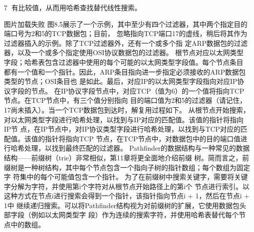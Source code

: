                                                             7
有比较值，从而用哈希查找替代线性搜索。




 图片加载失败
图8.5展示了一个示例，其中至少有四个过滤器，其中两个指定目的端口号为2和5的TCP数据包；目前，
忽略指向TCP端口17的虚线，稍后将其作为过滤器插入的示例。除了TCP过滤器外，还有一个或多个指
定ARP数据包的过滤器，以及一个或多个指定使用OSI协议数据包的过滤器。
根节点对应以太网类型字段；哈希表包含过滤器中使用的每个可能的以太网类型字段值。每个节点条目
都有一个值和一个指针。因此，ARP条目指向进一步指定必须接收的ARP数据包类型的节点；OSI条目也
是如此。最后，对应IP的以太网类型字段指向对应IP协议字段的节点。
在IP协议字段节点中，对应TCP（值为6）的一个值将指向TCP节点。在TCP节点中，有三个值分别指向
目的端口值为2和5的过滤器（请记住，17尚未插入）。当一个TCP数据包到达时，解复用过程如下。
从根节点开始搜索，对以太网类型字段进行哈希处理，以找到与IP对应的匹配值。该值的指针将指向IP节
点，在IP节点中，对IP协议类型字段进行哈希处理，以找到与TCP对应的匹配值。该值的指针将指向TCP
节点，在TCP节点中，对数据包中的目的端口值进行哈希处理，以找到最终匹配的过滤器。
Pathfinder的数据结构与一种常见的数据结构——前缀树（trie）非常相似，第11章将更全面地介绍前缀
树。简而言之，前缀树是一种树结构，其中每个节点包含一个指向子树的指针数组；每个数组为固定字
符集中的每个可能值包含一个指针。
为了在前缀树中搜索关键字，需要将关键字分解为字符，并使用第i个字符对从根节点开始路径上的第i个
节点进行索引。以这种方式在节点i进行搜索会得到一个指针，该指针指向节点i + 1，然后在节点i + 1中
继续递归搜索。可以将Pathfinder结构视为对前缀树的扩展，它使用数据包头部字段（例如以太网类型字
段）作为连续的搜索字符，并使用哈希表替代每个节点中的数组。

